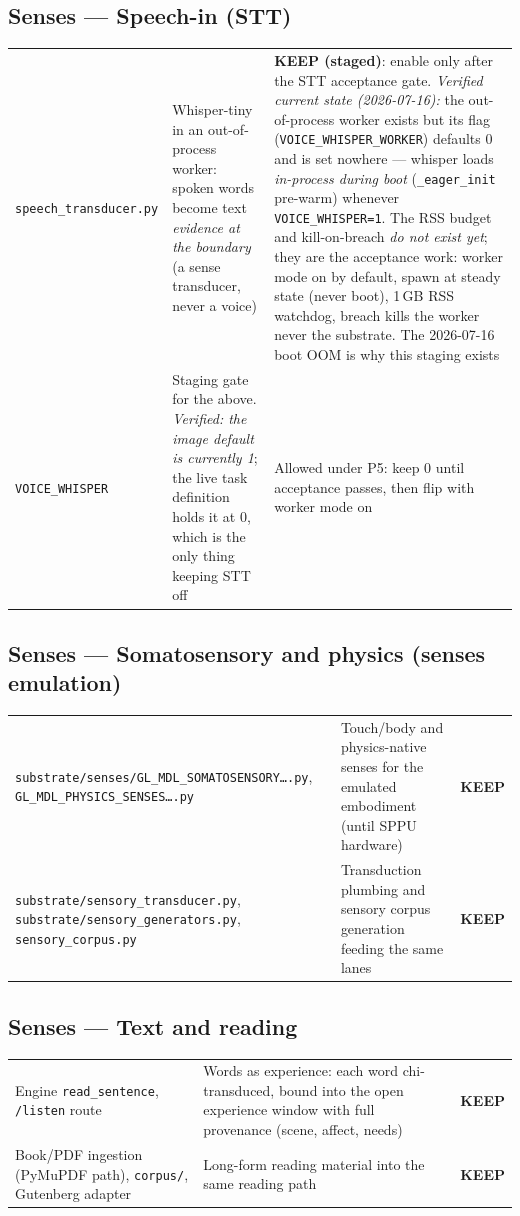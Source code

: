 \documentclass[11pt]{article}
\newcommand{\keep}{\textbf{KEEP}}
\newcommand{\keepstaged}{\textbf{KEEP (staged)}}
\begin{document}
\subsection{Senses — Speech-in (STT)}
\begin{longtable}{p{} p{} p{}}
\toprule
\texttt{speech\_transducer.py} &
Whisper-tiny in an out-of-process worker: spoken words become text
\emph{evidence at the boundary} (a sense transducer, never a voice) &
\keepstaged{}: enable only after the STT acceptance gate. \emph{Verified
current state (2026-07-16):} the out-of-process worker exists but its flag
(\texttt{VOICE\_WHISPER\_WORKER}) defaults 0 and is set nowhere — whisper
loads \emph{in-process during boot} (\texttt{\_eager\_init} pre-warm)
whenever \texttt{VOICE\_WHISPER=1}. The RSS budget and kill-on-breach
\emph{do not exist yet}; they are the acceptance work: worker mode on by
default, spawn at steady state (never boot), 1\,GB RSS watchdog,
breach kills the worker never the substrate. The 2026-07-16 boot OOM is
why this staging exists \\
\texttt{VOICE\_WHISPER} &
Staging gate for the above. \emph{Verified: the image default is
currently 1}; the live task definition holds it at 0, which is the only
thing keeping STT off &
Allowed under P5: keep 0 until acceptance passes, then flip with worker
mode on \\
\bottomrule
\end{longtable}

\subsection{Senses — Somatosensory and physics (senses emulation)}
\begin{longtable}{p{} p{} p{}}
\toprule
\texttt{substrate/senses/GL\_MDL\_SOMATOSENSORY\ldots.py},
\texttt{GL\_MDL\_PHYSICS\_SENSES\ldots.py} &
Touch/body and physics-native senses for the emulated embodiment (until
SPPU hardware) &
\keep{} \\
\texttt{substrate/sensory\_transducer.py},
\texttt{substrate/sensory\_generators.py}, \texttt{sensory\_corpus.py} &
Transduction plumbing and sensory corpus generation feeding the same lanes &
\keep{} \\
\bottomrule
\end{longtable}

\subsection{Senses — Text and reading}
\begin{longtable}{p{} p{} p{}}
\toprule
Engine \texttt{read\_sentence}, \texttt{/listen} route &
Words as experience: each word chi-transduced, bound into the open
experience window with full provenance (scene, affect, needs) &
\keep{} \\
Book/PDF ingestion (PyMuPDF path), \texttt{corpus/}, Gutenberg adapter &
Long-form reading material into the same reading path &
\keep{} \\
\bottomrule
\end{longtable}
\end{document}
